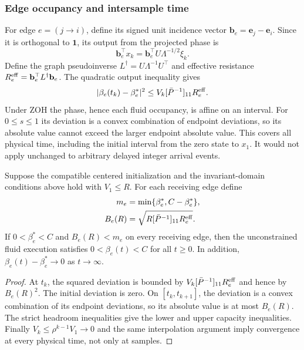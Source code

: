 \subsubsection{Edge occupancy and intersample time}
For edge $e=(j\to i)$, define its signed unit incidence vector
$\mathbf b_e=\mathbf e_j-\mathbf e_i$. Since it is orthogonal to
$\mathbf1$, its output from the projected phase is
\[
 \mathbf b_e^\top x_k=\mathbf b_e^\top U\Lambda^{-1/2}\xi_k.
\]
Define the graph pseudoinverse $L^\dagger=U\Lambda^{-1}U^\top$ and
effective resistance $R_e^{\rm eff}=\mathbf b_e^\top L^\dagger\mathbf b_e$.
The quadratic output inequality gives
\begin{equation}
 |\beta_e(t_k)-\beta_e^*|^2
 \le V_k[\bar P^{-1}]_{11}R_e^{\rm eff}.
 \label{detail:eq:btd_edge_bound}
\end{equation}
Under ZOH the phase, hence each fluid occupancy, is affine on an interval.
For $0\le s\le1$ its deviation is a convex combination of endpoint
deviations, so its absolute value cannot exceed the larger endpoint
absolute value. This covers all physical time, including the initial
interval from the zero state to $x_1$. It would not apply unchanged to
arbitrary delayed integer arrival events.

\begin{btdcorollary}
\label{detail:cor:btd_buffer_safety}
Suppose the compatible centered initialization and the invariant-domain
conditions above hold with $V_1\le R$. For each receiving edge define
\begin{align}
 m_e&=\min\{\beta_e^*,C-\beta_e^*\},\nonumber\\
 B_e(R)&=\sqrt{R[\bar P^{-1}]_{11}R_e^{\rm eff}}.
 \label{detail:eq:btd_buffer_headroom_condition}
\end{align}
If $0<\beta_e^*<C$ and $B_e(R)<m_e$ on every receiving edge,
then the unconstrained fluid execution satisfies
$0<\beta_e(t)<C$ for all $t\ge0$. In addition,
$\beta_e(t)-\beta_e^*\to0$ as $t\to\infty$.
\end{btdcorollary}
\begin{proof}
At $t_k$, the squared deviation is bounded by
$V_k[\bar P^{-1}]_{11}R_e^{\rm eff}$ and hence by $B_e(R)^2$.
The initial deviation is zero. On $[t_k,t_{k+1}]$, the deviation is a
convex combination of its endpoint deviations, so its absolute value
is at most $B_e(R)$. The strict headroom inequalities give the lower
and upper capacity inequalities. Finally $V_k\le\rho^{k-1}V_1\to0$
and the same interpolation argument imply convergence at every
physical time, not only at samples.
\end{proof}

